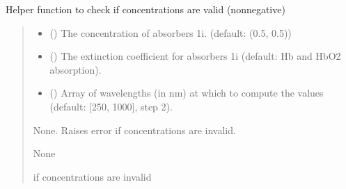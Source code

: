 \documentclass[letterpaper,10pt,english]{sphinxmanual}
\begin{document}

\begin{fulllineitems}
\label{\detokenize{generated/photon_canon.contrib.bio:photon_canon.contrib.bio.validate_concentrations_and_spectra}}
\pysigstartsignatures
\pysiglinewithargsret
{}
{\sphinxparamcomma {}\sphinxparamcomma {}}
{}
\pysigstopsignatures
\sphinxAtStartPar
Helper function to check if concentrations are valid (non\sphinxhyphen{}negative)
\begin{quote}\begin{description}
\begin{itemize}
\item {} 
\sphinxAtStartPar
{} (\sphinxstyleliteralemphasis{\sphinxupquote{{[}}}\sphinxstyleliteralemphasis{\sphinxupquote{{]}}}) \textendash{} The concentration of absorbers 1\sphinxhyphen{}i. (default: (0.5, 0.5))

\item {} 
\sphinxAtStartPar
{} (\sphinxstyleliteralemphasis{\sphinxupquote{{[}}}\sphinxstyleliteralemphasis{\sphinxupquote{{]}}}) \textendash{} The extinction coefficient for absorbers 1\sphinxhyphen{}i (default: Hb and HbO2 absorption).

\item {} 
\sphinxAtStartPar
{} (\sphinxstyleliteralemphasis{\sphinxupquote{{[}}}\sphinxstyleliteralemphasis{\sphinxupquote{{]}}}) \textendash{} Array of wavelengths (in nm) at which to compute the values (default: {[}250, 1000{]}, step 2).

\end{itemize}

\sphinxAtStartPar
None. Raises error if concentrations are invalid.

\sphinxAtStartPar
None

\sphinxAtStartPar
{\hyperref[\detokenize{generated/photon_canon.contrib.bio:photon_canon.contrib.bio.ConcentrationError}]{}} \textendash{} if concentrations are invalid

\end{description}\end{quote}

\end{fulllineitems}
\end{document}
